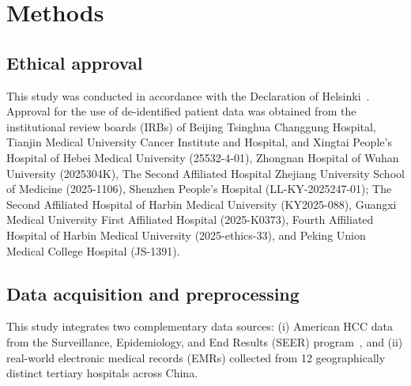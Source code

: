 \documentclass{article}
\begin{document}




\section{Methods}\label{sec4}
\subsection{Ethical approval}
This study was conducted in accordance with the Declaration of Helsinki~\cite{wma_helsinki_2013}. Approval for the use of de-identified patient data was obtained from the institutional review boards (IRBs) of Beijing Tsinghua Changgung Hospital, Tianjin Medical University Cancer Institute and Hospital, and Xingtai People's Hospital of Hebei Medical University (25532-4-01), Zhongnan Hospital of Wuhan University (2025304K), The Second Affiliated Hospital Zhejiang University School of Medicine (2025-1106), Shenzhen People's Hospital (LL-KY-2025247-01); The Second Affiliated Hospital of Harbin Medical University (KY2025-088), Guangxi Medical University First Affiliated Hospital (2025-K0373), Fourth Affiliated Hospital of Harbin Medical University (2025-ethics-33), and Peking Union Medical College Hospital (JS-1391).



\subsection{Data acquisition and preprocessing}
This study integrates two complementary data sources: (i) American HCC data from the Surveillance, Epidemiology, and End Results (SEER) program~\cite{seer_overview}, and (ii) real-world electronic medical records (EMRs) collected from 12 geographically distinct tertiary hospitals across China.
\end{document}
